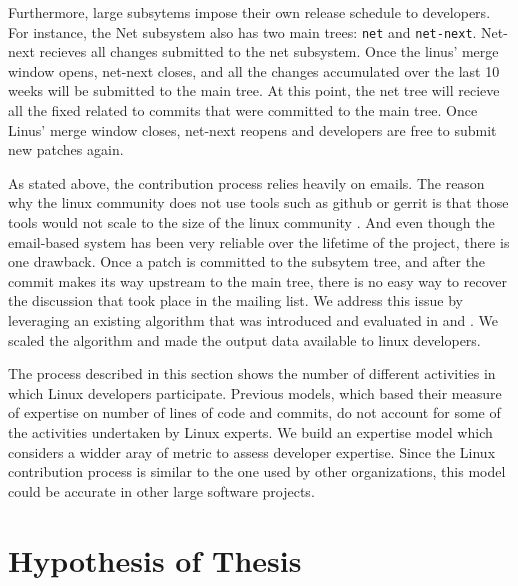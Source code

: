 Furthermore, large subsytems impose their own release schedule to developers. For instance, the Net subsystem also has two main trees: \texttt{net} and \texttt{net-next}. Net-next recieves all changes submitted to the net subsystem. Once the linus' merge window opens, net-next closes, and all the changes accumulated over the last 10 weeks will be submitted to the main tree. At this point, the net tree will recieve all the fixed related to commits that were committed to the main tree. Once Linus' merge window closes, net-next reopens and developers are free to submit new patches again. 

As stated above, the contribution process relies heavily on emails. The reason why the linux community does not use tools such as github or gerrit is that those tools would not scale to the size of the linux community \citep{armstrong}. And even though the email-based system has been very reliable over the lifetime of the project, there is one drawback. Once a patch is committed to the subsytem tree, and after the commit makes its way upstream to the main tree, there is no easy way to recover the discussion that took place in the mailing list. We address this issue by leveraging an existing algorithm that was introduced and evaluated in \citep{msr13jojo} and \citep{jiang14}. We scaled the algorithm and made the output data available to linux developers.

The process described in this section shows the number of different activities in which Linux developers participate. Previous models, which based their measure of expertise on number of lines of code and commits, do not account for some of the activities undertaken by Linux experts. We build an expertise model which considers a widder aray of metric to assess developer expertise. Since the Linux contribution process is similar to the one used by other organizations, this model could be accurate in other large software projects. 




\section{Hypothesis of Thesis}

